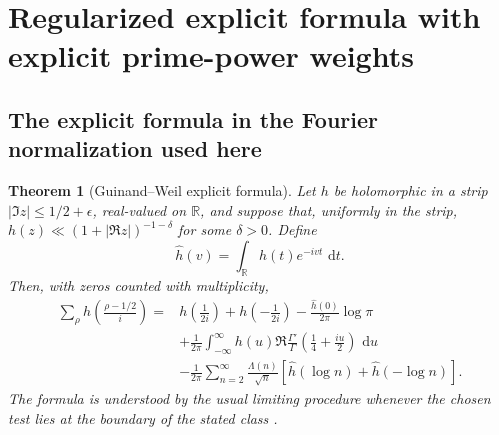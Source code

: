\documentclass[11pt]{amsart}
\numberwithin{equation}{section}
\theoremstyle{plain}
\newtheorem{theorem}{Theorem}[section]
\theoremstyle{definition}
\theoremstyle{remark}
\newcommand{\1}{\mathbf{1}}
\newcommand{\dd}{\,\mathrm{d}}
\begin{document}
\section{Regularized explicit formula with explicit prime-power weights}
\label{sec:regularized_explicit_formula_detailed}

\subsection{The explicit formula in the Fourier normalization used here}
\label{subsec:guinand_weil_normalization}

\begin{theorem}[Guinand--Weil explicit formula]
\label{thm:guinand_weil_normalized}
Let \(h\) be holomorphic in a strip
\(|\Im z|\leq1/2+\epsilon\), real-valued on \(\mathbb R\), and suppose
that, uniformly in the strip,
\(h(z)\ll(1+|\Re z|)^{-1-\delta}\) for some \(\delta>0\).  Define
\begin{equation}
\widehat h(v)
=
\int_{\mathbb R}h(t)e^{-ivt}\,\dd t.
\label{eq:guinand_fourier_convention}
\end{equation}
Then, with zeros counted with multiplicity,
\begin{align}
\sum_\rho
h\!\left(\frac{\rho-1/2}{i}\right)
={}&
h\!\left(\frac1{2i}\right)
+
h\!\left(-\frac1{2i}\right)
-
\frac{\widehat h(0)}{2\pi}\log\pi
\label{eq:guinand_archimedean_first}
\\
&+
\frac1{2\pi}
\int_{-\infty}^{\infty}
 h(u)
 \Re\frac{\Gamma'}{\Gamma}
 \!\left(\frac14+\frac{iu}{2}\right)
\,\dd u
\label{eq:guinand_archimedean_second}
\\
&-
\frac1{2\pi}
\sum_{n=2}^{\infty}
\frac{\Lambda(n)}{\sqrt n}
\left[
\widehat h(\log n)+\widehat h(-\log n)
\right].
\label{eq:guinand_prime_side}
\end{align}
The formula is understood by the usual limiting procedure whenever the
chosen test lies at the boundary of the stated class
\cite{Guinand1948,Weil1952}.
\end{theorem}
\end{document}

